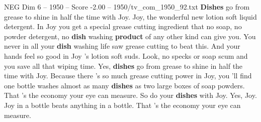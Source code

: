 \begin{textsample}{NEG Dim 6 – 1950 – Score -2.00 – 1950/tv\_com\_1950\_92.txt}  \label{ex:f6_neg_090}
\textbf{Dishes} go from grease to shine in half the time with Joy.
Joy, the wonderful new lotion soft liquid detergent.
In Joy you get a special grease cutting ingredient that no soap, no powder detergent, no \textbf{dish} washing \textbf{product} of any other kind can give you.
You never in all your \textbf{dish} washing life saw grease cutting to beat this.
And your hands feel so good in Joy 's lotion soft suds.
Look, no specks or soap scum and you save all that wiping time.
Yes, \textbf{dishes} go from grease to shine in half the time with Joy.
Because there 's so much grease cutting power in Joy, you 'll find one bottle washes almost as many \textbf{dishes} as two large boxes of soap powders.
That 's the economy your eye can measure.
So do your \textbf{dishes} with Joy.
Yes, Joy.
Joy in a bottle beats anything in a bottle.
That 's the economy your eye can measure.

\end{textsample}
